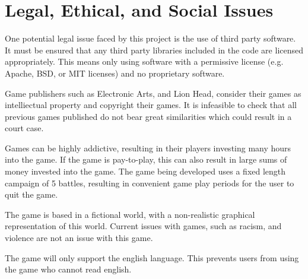 \section{Legal, Ethical, and Social Issues}
\label{section:professional_issues}

One potential legal issue faced by this project is the use of third party software.
It must be ensured that any third party libraries included in the code are licensed
appropriately. This means only using software with a permissive license (e.g. Apache, BSD, or MIT licenses) and no proprietary software.

Game publishers such as Electronic Arts, and Lion Head, consider their games as intelliectual property and copyright their games.
It is infeasible to check that all previous games published do not bear great similarities which could result in a court case.

Games can be highly addictive, resulting in their players investing many hours into the game.
If the game is pay-to-play, this can also result in large sums of money invested into the game.
The game being developed uses a fixed length campaign of 5 battles, resulting in convenient game play periods for the user to quit the game.  

The game is based in a fictional world, with a non-realistic graphical representation of this world. Current issues with games, such as racism, and violence are not an issue with this game.

The game will only support the english language.
This prevents users from using the game who cannot read english.



